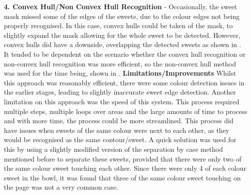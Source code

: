 \textbf{4. Convex Hull/Non Convex Hull Recognition} - Occasionally, the sweet mask missed some of the edges of the sweets, due to the colour edges not being properly recognised. In this case, convex hulls could be taken of the mask, to slightly expand the mask allowing for the whole sweet to be detected. However, convex hulls did have a downside, overlapping the detected sweets as shown in \textbf{}. It tended to be dependent on the scenario whether the convex hull recognition or non-convex hull recognition was more efficient, so the non-convex hull method was used for the time being, shown in \textbf{}.
\newline\newline
\textbf{Limitations/Improvements}\newline
Whilst this approach was reasonably efficient, there were some colour detection issues in the earlier stages, leading to slightly inaccurate sweet edge detection. Another limitation on this approach was the speed of this system. This process required multiple steps, multiple loops over areas and the large amounts of time to process and with more time, the process could be more streamlined.
\newline\newline
This process did have issues when sweets of the same colour were next to each other, as they would be recognised as the same contour/sweet. A quick solution was used for this by using a slightly modified version of the separation by case method mentioned before to separate these sweets, provided that there were only two of the same colour sweet touching each other. Since there were only 4 of each colour sweet in the bowl, it was found that three of the same colour sweet touching on the page was not a very common case.
